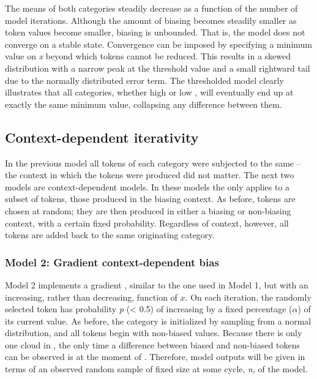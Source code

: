 The means of both categories steadily decrease as a function of the
number of model iterations. Although the amount of biasing becomes
steadily smaller as token values become smaller, biasing is unbounded.
That is, the model does not converge on a stable state. Convergence
can be imposed by specifying a minimum value on \emph{x} beyond which
tokens cannot be reduced. This results in a skewed distribution with
a narrow peak at the threshold value and a small rightward tail due
to the normally distributed error term. The thresholded model clearly
illustrates that all categories, whether high or low , will
eventually end up at exactly the same minimum value, collapsing any
difference between them. 

\subsection{\label{sec:Context-Dependent-Iterativity}Context-dependent iterativity}

In the previous model all tokens of each category were subjected to
the same   – the context in which the tokens were produced
did not matter. The next two models are context-dependent models.
In these models the   only applies to a subset of tokens,
those produced in the biasing context. As before,  tokens
are chosen at random; they are then produced in either a biasing or
non-biasing context, with a certain fixed probability. Regardless
of  context, however, all tokens are added back to the same
originating category.

\subsubsection{\label{subsec:Phrase-Final Lengthening}Model 2: Gradient context-dependent bias}

Model 2 implements a gradient  , similar to the one
used in Model 1, but with an increasing, rather than decreasing, function
of $x$. On each iteration, the randomly selected token has probability
\emph{p} (< 0.5) of increasing by a fixed percentage ($\alpha$) of
its current value. As before, the category is initialized by sampling
from a normal distribution, and all tokens begin with non-biased values.
Because there is only one cloud in , the only time a difference
between biased and non-biased tokens can be observed is at the moment
of . Therefore, model outputs will be given in terms of
an observed random sample of fixed size at some cycle, \emph{n}, of
the model.

